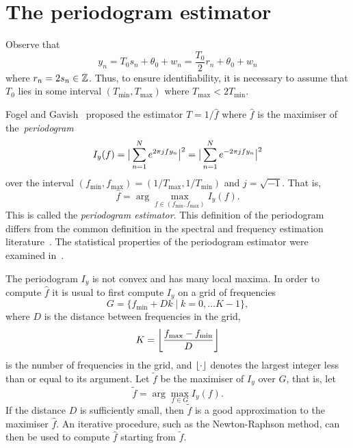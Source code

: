 \documentclass[10pt,twocolumn,twoside]{IEEEtran}
\begin{document}
\section{The periodogram estimator}\label{sec:peri-estim}

Observe that
\[
y_n = T_0 s_n + \theta_0 + w_n = \frac{T_0}{2} r_n + \theta_0 + w_n
\]
where $r_n = 2s_n \in {\mathbb Z}$.  Thus, to ensure identifiability, it is necessary to assume that $T_0$ lies in some interval $(T_{\text{min}}, T_{\text{max}})$ where $T_{\text{max}} < 2T_{\text{min}}$.%


Fogel and Gavish~\cite{Fogel1988,Fogel1989_bit_synch_zero_crossings} proposed the estimator $\hat{T} = 1/\hat{f}$ where $\hat{f}$ is the maximiser of the~\emph{periodogram}
\[
I_y(f) = \big\vert  \sum_{n=1}^N e^{ 2\pi j f y_n}  \big\vert^2 = \big\vert  \sum_{n=1}^N e^{ -2\pi j f y_n}  \big\vert^2 
\]
over the interval $(f_{\text{min}}, f_{\text{max}}) = (1/T_{\text{max}}, 1/T_{\text{min}})$ and $j = \sqrt{-1}$.  That is,
\[
\hat{f} = \arg\max_{f \in (f_{\text{min}}, f_{\text{max}})} I_y(f).
\] 
This is called the \emph{periodogram estimator}.  This definition of the periodogram differs from the common definition in the spectral and frequency estimation literature~\cite{Hannan_time_series_1967,Quinn2001}.  The statistical properties of the periodogram estimator were examined in~\cite{Quinn20013asilomar_period_est}.

The periodogram $I_y$ is not convex and has many local maxima.  In order to compute $\hat{f}$ it is usual to first compute $I_y$ on a grid of frequencies
\[
G = \{ f_{\text{min}} + Dk \mid k = 0, \dots K-1 \},
\]
where $D$ is the distance between frequencies in the grid, 
\[
K =  {\left\lfloor \frac{f_{\text{max}} - f_{\text{min}}}{D} \right\rfloor}
\]
is the number of frequencies in the grid, and ${\left\lfloor \cdot \right\rfloor}$ denotes the largest integer less than or equal to its argument.  
Let $\widetilde{f}$ be the maximiser of $I_y$ over $G$, that is, let
\[
\widetilde{f} = \arg\max_{f \in G} I_y(f).
\]
If the distance $D$ is sufficiently small, then $\widetilde{f}$ is a good approximation to the maximiser $\hat{f}$.  An iterative procedure, such as the Newton-Raphson method, %
can then be used to compute $\hat{f}$ starting from $\widetilde{f}$.
\end{document}
